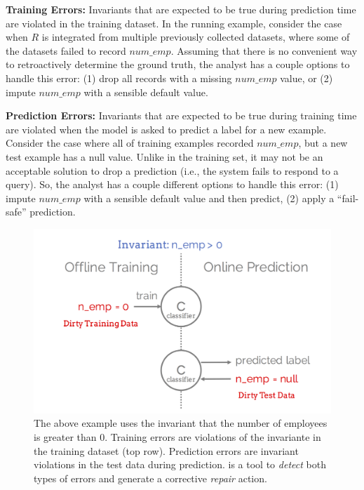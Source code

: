 \vspace{0.5em}\noindent\textbf{Training Errors: } Invariants that are expected to be true during prediction time are violated in the training dataset. In the running example, consider the case when $R$ is integrated from multiple previously collected datasets, where some of the datasets failed to record $num\_emp$. Assuming that there is no convenient way to retroactively determine the ground truth, the analyst has a couple options to handle this error: (1) drop all records with a missing  $num\_emp$ value, or (2) impute $num\_emp$ with a sensible default value.

\vspace{0.25em}\noindent\textbf{Prediction Errors: } Invariants that are expected to be true during training time are violated when the model is asked to predict a label for a new example. 
Consider the case where all of training examples recorded $num\_emp$, but a new test example has a null value.
Unlike in the training set, it may not be an acceptable solution to drop a prediction (i.e., the system fails to respond to a query).
So, the analyst has a couple different options to handle this error: (1) impute $num\_emp$ with a sensible default value and then predict, (2) apply a ``fail-safe'' prediction.

\begin{figure}[t]
\centering
 \includegraphics[width=0.8\columnwidth]{figures/training_and_pred_errors.png}
 \caption{The above example uses the invariant that the number of employees is greater than $0$.  Training errors are violations of the invariante in the training dataset (top row). Prediction errors are invariant violations in the test data during prediction. \sys is a tool to {\it detect} both types of errors and generate a corrective {\it repair} action.
 \label{fig:error}}
\end{figure}

